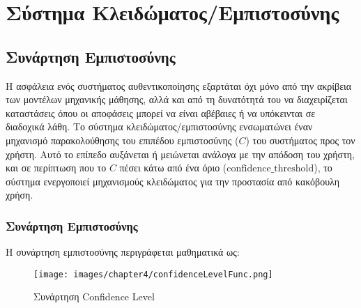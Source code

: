\section{Σύστημα Κλειδώματος/Εμπιστοσύνης}
\label{sec:implementation_lock}

\subsection{Συνάρτηση Εμπιστοσύνης}
Η ασφάλεια ενός συστήματος αυθεντικοποίησης εξαρτάται όχι μόνο από την ακρίβεια των μοντέλων μηχανικής μάθησης, αλλά και από τη δυνατότητά του να διαχειρίζεται καταστάσεις όπου οι αποφάσεις μπορεί να είναι αβέβαιες ή να υπόκεινται σε διαδοχικά λάθη. Το σύστημα κλειδώματος/εμπιστοσύνης ενσωματώνει έναν μηχανισμό παρακολούθησης του επιπέδου εμπιστοσύνης ($C$) του συστήματος προς τον χρήστη. Αυτό το επίπεδο αυξάνεται ή μειώνεται ανάλογα με την απόδοση του χρήστη, και σε περίπτωση που το $C$ πέσει κάτω από ένα όριο ($\text{confidence\_threshold}$), το σύστημα ενεργοποιεί μηχανισμούς κλειδώματος για την προστασία από κακόβουλη χρήση.

\subsubsection{Συνάρτηση Εμπιστοσύνης}
Η συνάρτηση εμπιστοσύνης περιγράφεται μαθηματικά ως:

\begin{figure}[H]
    \centering
    \texttt{[image: images/chapter4/confidenceLevelFunc.png]}
    \caption{Συνάρτηση Confidence Level}
    \label{fig:confidenceLevelFunction}
\end{figure}



